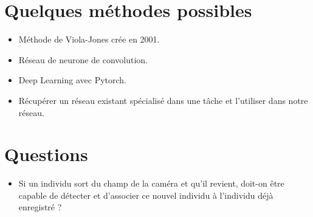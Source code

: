\documentclass[11pt]{report}
\begin{document}
\section{Quelques méthodes possibles}
	\begin{itemize}
		\item Méthode de Viola-Jones crée en 2001.
		\item Réseau de neurone de convolution.
		\item Deep Learning avec Pytorch.
		\item Récupérer un réseau existant spécialisé dans une tâche et l'utiliser dans notre réseau.
	\end{itemize}

\section{Questions}
	\begin{itemize}
		\item Si un individu sort du champ de la caméra et qu'il revient, doit-on être capable de détecter et d'associer ce nouvel individu à l'individu déjà enregistré ?
	\end{itemize}
		
\end{document}
